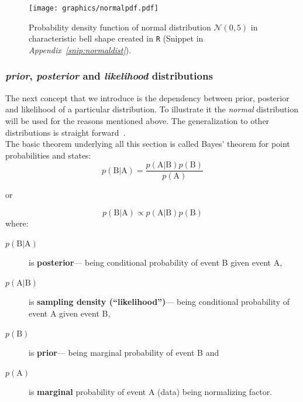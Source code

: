 \documentclass[12pt, a4paper, pdflatex]{report}
\begin{document}
\begin{figure}[htbp]
\centering
\texttt{[image: graphics/normalpdf.pdf]}
\begin{tiny}
\caption{Probability density function of normal distribution $\mathcal{N}\left( 0, 5 \right)$ in characteristic bell shape created in \texttt{R} (Snippet in \emph{Appendix~\ref{snip:normaldist}}).\label{fig:normaldist}}
\end{tiny}
\vspace{1cm}
\end{figure}



\subsubsection{\emph{prior}, \emph{posterior} and \emph{likelihood} distributions}
The next concept that we introduce is the dependency between prior, posterior and likelihood of a particular distribution. To illustrate it the \emph{normal} distribution will be used for the reasons mentioned above. The generalization to other distributions is straight forward~\cite{gelman2003bayesian}.\\

The basic theorem underlying all this section is called Bayes' theorem for point probabilities and states:
$$
p \left( \mathrm{B} | \mathrm{A} \right) = \frac{  p \left( \mathrm{A} | \mathrm{B} \right) p \left( \mathrm{B} \right) }{ p \left( \mathrm{A} \right) }
$$
\begin{center}
or
\end{center}
$$
p \left( \mathrm{B} | \mathrm{A} \right) \propto p \left( \mathrm{A} | \mathrm{B} \right) p \left( \mathrm{B} \right)
$$
where:
\begin{description}
\item[$p \left( \mathrm{B} | \mathrm{A} \right)$] is \textbf{posterior}--- being conditional probability of event \textrm{B} given event \textrm{A},
\item[$p \left( \mathrm{A} | \mathrm{B} \right)$] is \textbf{sampling density (``likelihood'')}--- being conditional probability of event \textrm{A} given event \textrm{B},
\item[$p \left( \mathrm{B} \right)$] is \textbf{prior}--- being marginal probability of event \textrm{B} and
\item[$p \left( \mathrm{A} \right)$] is \textbf{marginal} probability of event \textrm{A} (data) being normalizing factor.
\end{description}
\end{document}
